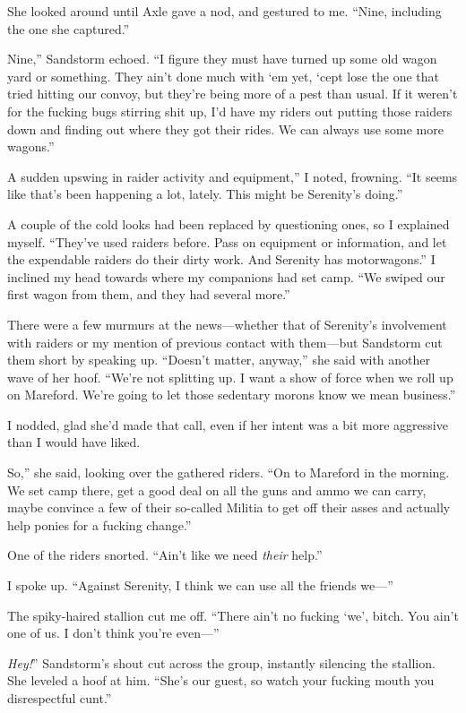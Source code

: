 She looked around until Axle gave a nod, and gestured to me. “Nine, including the one she captured.”

\leavevmode{}Nine,” Sandstorm echoed. “I figure they must have turned up some old wagon yard or something. They ain’t done much with ‘em yet, ‘cept lose the one that tried hitting our convoy, but they’re being more of a pest than usual. If it weren’t for the fucking bugs stirring shit up, I’d have my riders out putting those raiders down and finding out where they got their rides. We can always use some more wagons.”

\leavevmode{}A sudden upswing in raider activity and equipment,” I noted, frowning. “It seems like that’s been happening a lot, lately. This might be Serenity’s doing.”

A couple of the cold looks had been replaced by questioning ones, so I explained myself. “They’ve used raiders before. Pass on equipment or information, and let the expendable raiders do their dirty work. And Serenity has motorwagons.” I inclined my head towards where my companions had set camp. “We swiped our first wagon from them, and they had several more.”

There were a few murmurs at the news—whether that of Serenity’s involvement with raiders or my mention of previous contact with them—but Sandstorm cut them short by speaking up. “Doesn’t matter, anyway,” she said with another wave of her hoof. “We’re not splitting up. I want a show of force when we roll up on Mareford. We’re going to let those sedentary morons know we mean business.”

I nodded, glad she’d made that call, even if her intent was a bit more aggressive than I would have liked.

\leavevmode{}So,” she said, looking over the gathered riders. “On to Mareford in the morning. We set camp there, get a good deal on all the guns and ammo we can carry, maybe convince a few of their so-called Militia to get off their asses and actually help ponies for a fucking change.”

One of the riders snorted. “Ain’t like we need \textit{their} help.”

I spoke up. “Against Serenity, I think we can use all the friends we—”

The spiky-haired stallion cut me off. “There ain’t no fucking ‘we’, bitch. You ain’t one of us. I don’t think you’re even—”

\leavevmode{}\textit{Hey!}” Sandstorm’s shout cut across the group, instantly silencing the stallion. She leveled a hoof at him. “She’s our guest, so watch your fucking mouth you disrespectful cunt.”

